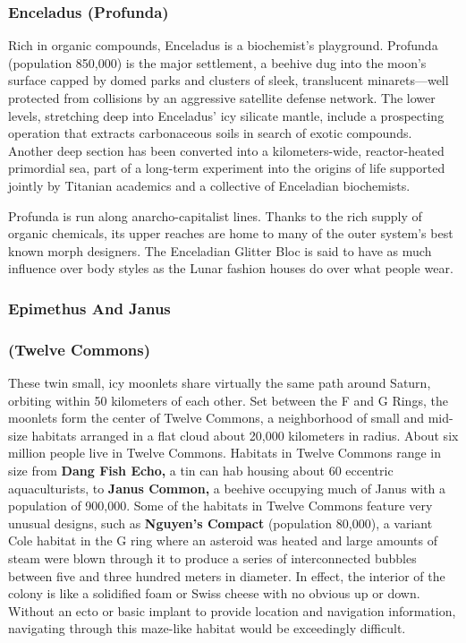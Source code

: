 \subsubsection{Enceladus (Profunda)}

Rich in organic compounds, Enceladus 
is a biochemist's playground. Profunda 
(population 850,000) is the major 
settlement, a beehive dug into the moon's 
surface capped by domed parks and clusters of sleek, translucent minarets—well 
protected from collisions by an aggressive satellite defense network. The lower 
levels, stretching deep into Enceladus' 
icy silicate mantle, include a prospecting 
operation that extracts carbonaceous soils 
in search of exotic compounds. Another 
deep section has been converted into a 
kilometers-wide, reactor-heated primordial sea, part of a long-term experiment 
into the origins of life supported jointly 
by Titanian academics and a collective of 
Enceladian biochemists.

Profunda is run along anarcho-capitalist lines. Thanks to the rich supply of 
organic chemicals, its upper reaches are 
home to many of the outer system's best 
known morph designers. The Enceladian 
Glitter Bloc is said to have as much influence over body styles as the Lunar fashion 
houses do over what people wear.

\subsubsection{Epimethus And Janus}


\subsubsection{(Twelve Commons)}

These twin small, icy moonlets share 
virtually the same path around Saturn, 
orbiting within 50 kilometers of each 
other. Set between the F and G Rings, 
the moonlets form the center of Twelve 
Commons, a neighborhood of small and 
mid-size habitats arranged in a flat cloud 
about 20,000 kilometers in radius. About 
six million people live in Twelve Commons. Habitats in Twelve Commons range 
in size from \textbf{Dang Fish Echo,} a tin can hab 
housing about 60 eccentric aquaculturists, 
to  \textbf{Janus Common,} a beehive occupying much of Janus with a population of 
900,000. Some of the habitats in Twelve 
Commons feature very unusual designs, 
such as \textbf{Nguyen's Compact} (population 
80,000), a variant Cole habitat in the 
G ring where an asteroid was heated 
and large amounts of steam were blown 
through it to produce a series of interconnected bubbles between five and three 
hundred meters in diameter. In effect, the 
interior of the colony is like a solidified 
foam or Swiss cheese with no obvious up 
or down. Without an ecto or basic implant 
to provide location and navigation information, navigating through this maze-like 
habitat would be exceedingly difficult.

